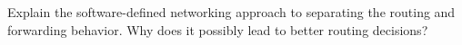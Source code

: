 \documentclass[12pt,addpoints,answers]{exam}
\begin{document}
\begin{questions}
\begin{solution}
\end{solution}

\question[8] Explain the software-defined networking approach to separating the routing and forwarding behavior. Why does it possibly lead to better routing decisions?
\begin{solution}
\end{solution}


\end{questions}
\end{document}
